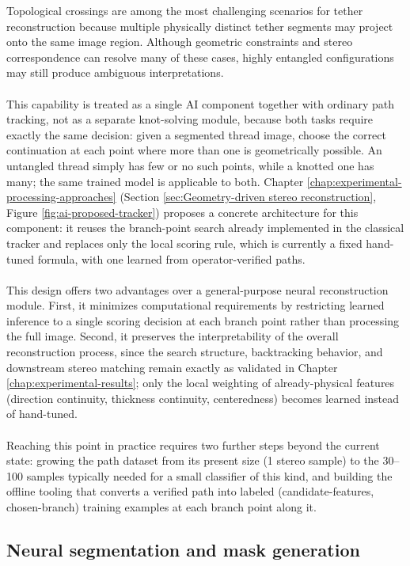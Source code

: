 Topological crossings are among the most challenging scenarios for tether reconstruction because multiple physically distinct tether segments may project onto the same image region. Although geometric constraints and stereo correspondence can resolve many of these cases, highly entangled configurations may still produce ambiguous interpretations.
\\\\
This capability is treated as a single AI component together with ordinary path tracking, not as a separate knot-solving module, because both tasks require exactly the same decision: given a segmented thread image, choose the correct continuation at each point where more than one is geometrically possible. An untangled thread simply has few or no such points, while a knotted one has many; the same trained model is applicable to both. Chapter \ref{chap:experimental-processing-approaches} (Section \ref{sec:Geometry-driven stereo reconstruction}, Figure \ref{fig:ai-proposed-tracker}) proposes a concrete architecture for this component: it reuses the branch-point search already implemented in the classical tracker and replaces only the local scoring rule, which is currently a fixed hand-tuned formula, with one learned from operator-verified paths.
\\\\
This design offers two advantages over a general-purpose neural reconstruction module. First, it minimizes computational requirements by restricting learned inference to a single scoring decision at each branch point rather than processing the full image. Second, it preserves the interpretability of the overall reconstruction process, since the search structure, backtracking behavior, and downstream stereo matching remain exactly as validated in Chapter \ref{chap:experimental-results}; only the local weighting of already-physical features (direction continuity, thickness continuity, centeredness) becomes learned instead of hand-tuned.
\\\\
Reaching this point in practice requires two further steps beyond the current state: growing the path dataset from its present size (1 stereo sample) to the 30--100 samples typically needed for a small classifier of this kind, and building the offline tooling that converts a verified path into labeled (candidate-features, chosen-branch) training examples at each branch point along it.

\subsection{Neural segmentation and mask generation}

